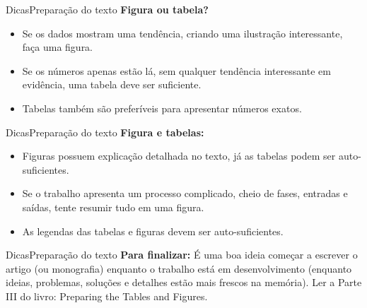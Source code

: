 \documentclass[t]{beamer}
\begin{document}



\begin{ftst}{Dicas}{Preparação do texto}
\justifying
\textbf{Figura ou tabela?}
\vone
\begin{itemize}
    \item Se os dados mostram uma tendência, criando uma ilustração interessante, faça uma figura.
    \item Se os números apenas estão lá, sem qualquer tendência interessante em evidência, uma tabela deve ser suficiente.
    \item Tabelas também são preferíveis para apresentar números exatos.
\end{itemize}

\end{ftst}




\begin{ftst}{Dicas}{Preparação do texto}
\justifying
\textbf{Figura e tabelas:}
\vone
\begin{itemize}
    \item Figuras possuem explicação detalhada no texto, já as tabelas podem ser auto-suficientes.
    \item Se o trabalho apresenta um processo complicado, cheio de fases, entradas e saídas, tente resumir tudo em uma figura.
    \item As legendas das tabelas e figuras devem ser auto-suficientes. 
\end{itemize}

\end{ftst}




\begin{ftst}{Dicas}{Preparação do texto}
\justifying
\textbf{Para finalizar:}
\vone
É uma boa ideia começar a escrever o artigo (ou monografia) enquanto o trabalho está em desenvolvimento (enquanto ideias, problemas, soluções e detalhes estão mais frescos na memória). 
\vone
Ler a Parte III do livro: Preparing the Tables and Figures.

\end{ftst}
\end{document}
